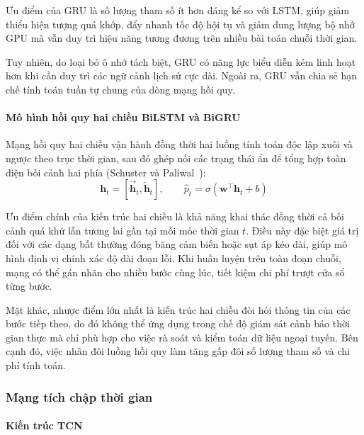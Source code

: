 Ưu điểm của GRU là số lượng tham số ít hơn đáng kể so với LSTM, giúp giảm thiểu hiện tượng quá khớp, đẩy nhanh tốc độ hội tụ và giảm dung lượng bộ nhớ GPU mà vẫn duy trì hiệu năng tương đương trên nhiều bài toán chuỗi thời gian.

Tuy nhiên, do loại bỏ ô nhớ tách biệt, GRU có năng lực biểu diễn kém linh hoạt hơn khi cần duy trì các ngữ cảnh lịch sử cực dài. Ngoài ra, GRU vẫn chia sẻ hạn chế tính toán tuần tự chung của dòng mạng hồi quy.

\paragraph{Mô hình hồi quy hai chiều BiLSTM và BiGRU}

Mạng hồi quy hai chiều vận hành đồng thời hai luồng tính toán độc lập xuôi và ngược theo trục thời gian, sau đó ghép nối các trạng thái ẩn để tổng hợp toàn diện bối cảnh hai phía (Schuster và Paliwal~\cite{birnn}):
\begin{equation*}
    \mathbf{h}_t = \left[\overrightarrow{\mathbf{h}}_t, \overleftarrow{\mathbf{h}}_t\right], \qquad \hat{p}_t = \sigma\left(\mathbf{w}^{\top} \mathbf{h}_t + b\right)
\end{equation*}

Ưu điểm chính của kiến trúc hai chiều là khả năng khai thác đồng thời cả bối cảnh quá khứ lẫn tương lai gần tại mỗi mốc thời gian $t$. Điều này đặc biệt giá trị đối với các dạng bất thường đóng băng cảm biến hoặc sụt áp kéo dài, giúp mô hình định vị chính xác độ dài đoạn lỗi. Khi huấn luyện trên toàn đoạn chuỗi, mạng có thể gán nhãn cho nhiều bước cùng lúc, tiết kiệm chi phí trượt cửa sổ từng bước.

Mặt khác, nhược điểm lớn nhất là kiến trúc hai chiều đòi hỏi thông tin của các bước tiếp theo, do đó không thể ứng dụng trong chế độ giám sát cảnh báo thời gian thực mà chỉ phù hợp cho việc rà soát và kiểm toán dữ liệu ngoại tuyến. Bên cạnh đó, việc nhân đôi luồng hồi quy làm tăng gấp đôi số lượng tham số và chi phí tính toán.

\subsubsection{Mạng tích chập thời gian}

\paragraph{Kiến trúc TCN}

